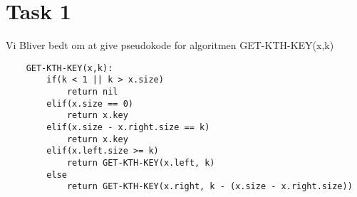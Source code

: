\section{Task 1}
Vi Bliver bedt om at give pseudokode for algoritmen GET-KTH-KEY(x,k)
\begin{lstlisting}
	GET-KTH-KEY(x,k):
		if(k < 1 || k > x.size)
			return nil
		elif(x.size == 0)
			return x.key
		elif(x.size - x.right.size == k)
			return x.key
		elif(x.left.size >= k)
			return GET-KTH-KEY(x.left, k)
		else
			return GET-KTH-KEY(x.right, k - (x.size - x.right.size))
\end{lstlisting}

